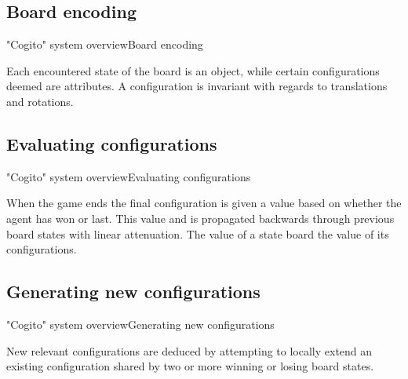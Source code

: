 \subsection{Board encoding}
\begin{frame}{"Cogito" system overview}{Board encoding}

Each encountered state of the board is an object, while certain configurations 
deemed are attributes. A configuration is invariant with regards to translations 
and rotations.

\end{frame}

\subsection{Evaluating configurations}
\begin{frame}{"Cogito" system overview}{Evaluating configurations}

When the game ends the final configuration is given a value based on whether the 
agent has won or last. This value and is propagated backwards through previous
board states with linear attenuation. The value of a state board the value 
of its configurations.

\end{frame}

\subsection{Generating new configurations}
\begin{frame}{"Cogito" system overview}{Generating new configurations}

New relevant configurations are deduced by attempting to locally extend an 
existing configuration shared by two or more winning or losing board states.

\end{frame}

